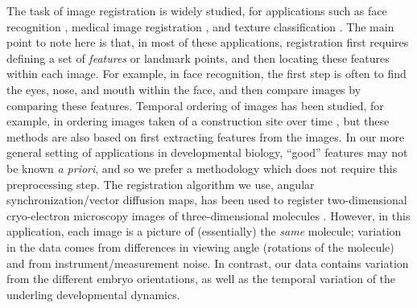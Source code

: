 \documentclass{pnastwo}
\begin{document}
\begin{article}
The task of image registration is widely studied, for applications such as face recognition \cite{rowley1998rotation}, medical image registration \cite{hajnal2010medical}, and texture classification \cite{greenspan1994rotation}.
%
The main point to note here is that, in most of these applications, registration first requires defining a set of {\em features} or landmark points, and then locating these features within each image.
%
For example, in face recognition, the first step is often to find the eyes, nose, and mouth within the face, and then compare images by comparing these features.
%
Temporal ordering of images has been studied, for example, in ordering images taken of a construction site over time \cite{schindler2007inferring}, 
but these methods are also based on first extracting features from the images. 
%
In our more general setting of applications in developmental biology, ``good'' features may not be known {\em a priori}, and so we prefer a methodology which does not require this preprocessing step.
%
The registration algorithm we use, angular synchronization/vector diffusion maps, has been used to register two-dimensional cryo-electron microscopy images of three-dimensional molecules \cite{singer2011three}.
%
However, in this application, each image is a picture of (essentially) the {\em same} molecule; variation in the data comes from differences in viewing angle (rotations of the molecule) and from instrument/measurement noise.
%
In contrast, our data contains variation from the different embryo orientations, as well as the temporal variation of the underling developmental dynamics. 


\end{article}
\end{document}

